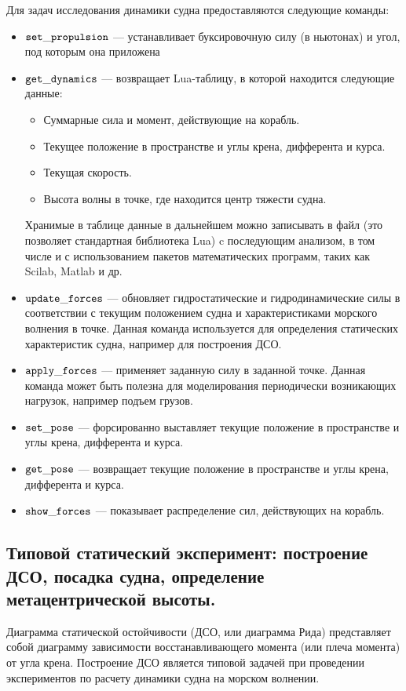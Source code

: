 Для задач исследования динамики судна предоставляются следующие команды:
\begin{itemize}
	\item	$\tt set\_propulsion$ --- устанавливает буксировочную силу (в ньютонах) и угол, 
			под которым она приложена
	\item	$\tt get\_dynamics$ --- возвращает Lua-таблицу, в которой находится следующие данные:
	\begin{itemize}
		\item	Суммарные сила и момент, действующие на корабль.
		\item	Текущее положение в пространстве и углы крена, дифферента и курса.
		\item	Текущая скорость.
		\item	Высота волны в точке, где находится центр тяжести судна.
	\end{itemize}
	Хранимые в таблице данные в дальнейшем можно записывать 
	в файл (это позволяет стандартная библиотека Lua) c последующим анализом, 
	в том числе и с использованием пакетов математических программ, таких как Scilab, Matlab и др.
	\item	$\tt update\_forces$ --- обновляет гидростатические и гидродинамические силы
			в соответствии с текущим положением судна и характеристиками морского волнения в точке. 
			Данная команда используется для определения статических характеристик судна, 
			например для построения ДСО.
	\item	$\tt apply\_forces$ --- применяет заданную силу в заданной точке. 
			Данная команда может быть полезна для моделирования периодически возникающих нагрузок, 
			например подъем грузов.
	\item	$\tt set\_pose$ --- форсированно выставляет текущие положение в пространстве 
			и углы крена, дифферента и курса.
	\item	$\tt get\_pose$ --- возвращает текущие положение в пространстве 
			и углы крена, дифферента и курса.
	\item	$\tt show\_forces$ --- показывает распределение сил, действующих на корабль.
\end{itemize}



\subsection{Типовой статический эксперимент: построение ДСО, посадка судна, определение метацентрической высоты.}

Диаграмма статической остойчивости (ДСО, или диаграмма Рида) представляет собой диаграмму зависимости восстанавливающего момента (или плеча момента) от угла крена.
Построение ДСО является типовой задачей при проведении экспериментов по расчету динамики судна на морском волнении.

